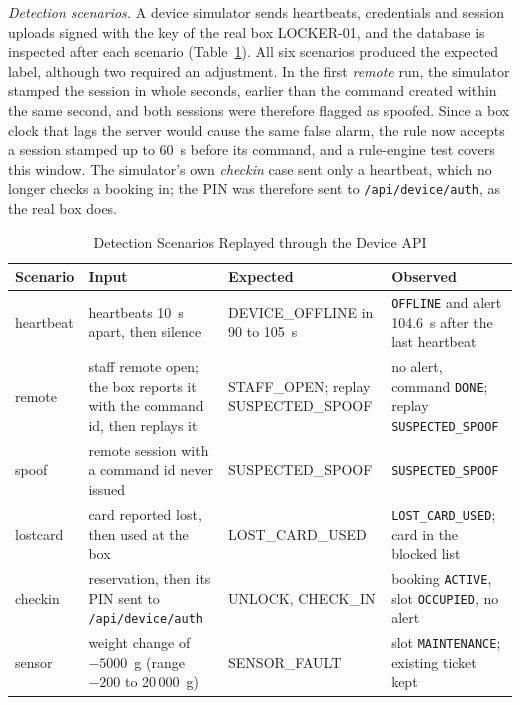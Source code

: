 \textit{Detection scenarios.} A device simulator sends heartbeats, credentials and session uploads signed with the key
of the real box LOCKER-01, and the database is inspected after each scenario (Table~\ref{tab:scen}). All six scenarios
produced the expected label, although two required an adjustment. In the first \emph{remote} run, the simulator
stamped the session in whole seconds, earlier than the command created within the same second, and both sessions were
therefore flagged as spoofed. Since a box clock that lags the server would cause the same false alarm, the rule now
accepts a session stamped up to 60~s before its command, and a rule-engine test covers this window. The simulator's
own \emph{checkin} case sent only a heartbeat, which no longer checks a booking in; the PIN was therefore sent to
\texttt{/api/device/auth}, as the real box does.

\begin{table}[!htbp]
\renewcommand{\arraystretch}{1.1}
\centering
\small
\caption{Detection Scenarios Replayed through the Device API}
\label{tab:scen}
\begin{tabular}{l >{\raggedright\arraybackslash}p{4.6cm} >{\raggedright\arraybackslash}p{3.4cm} >{\raggedright\arraybackslash}p{5.5cm}}
\hline
Scenario & Input & Expected & Observed \\
\hline
heartbeat & 6 heartbeats 10~s apart, then silence & DEVICE\_OFFLINE in 90 to 105~s & \texttt{OFFLINE} and alert 104.6~s after the last heartbeat \\
remote    & staff remote open; the box reports it with the command id, then replays it & STAFF\_OPEN; replay SUSPECTED\_SPOOF & no alert, command \texttt{DONE}; replay \texttt{SUSPECTED\_SPOOF} \\
spoof     & remote session with a command id never issued & SUSPECTED\_SPOOF & \texttt{SUSPECTED\_SPOOF} \\
lostcard  & card reported lost, then used at the box & LOST\_CARD\_USED & \texttt{LOST\_CARD\_USED}; card in the blocked list \\
checkin   & reservation, then its PIN sent to \texttt{/api/device/auth} & UNLOCK, CHECK\_IN & booking \texttt{ACTIVE}, slot \texttt{OCCUPIED}, no alert \\
sensor    & weight change of $-5000$~g (range $-200$ to 20\,000~g) & SENSOR\_FAULT & slot \texttt{MAINTENANCE}; existing ticket kept \\
\hline
\end{tabular}
\end{table}


